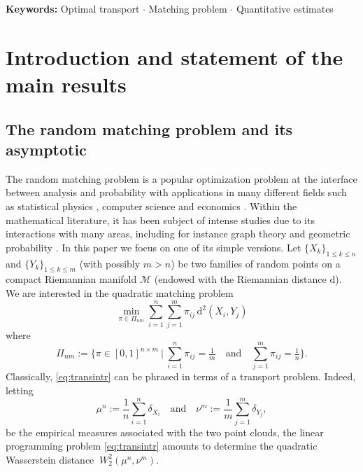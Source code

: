 \documentclass[11pt,a4paper,oneside]{amsart}
\numberwithin{equation}{section}
\newcommand{\dd}{\mathrm{d}}
\newcommand{\nc}[1]{\textcolor{red}{[N: #1]}}
\begin{document}
%
\maketitle
%
\begin{center}
\textbf{Keywords: }Optimal transport $\cdot$ Matching problem $\cdot$ Quantitative estimates
\end{center}
%

%
\tableofcontents
%
\section{Introduction and statement of the main results}\label{introsec}
%
\subsection{The random matching problem and its asymptotic}\label{TMP}
%




The random matching problem is a popular optimization problem at the interface between analysis and probability with applications in many different fields such as statistical physics \cite{caracciolo2014scaling, MezPar}, computer science \cite{CSMatch} and economics \cite{EcMatch, GalShap}. Within the mathematical literature, it has been subject of intense studies due to its interactions with many areas, including for instance graph theory \cite{lovasz2009matching} and geometric probability \cite{steele1997probability}. In this paper we focus on one of its simple versions. Let $\{X_k\}_{1\leq k\leq n}$ and $\{Y_k\}_{1\leq k\leq m}$ (with possibly $m>n$) be two families of random points on a compact Riemannian manifold $\mathcal{M}$ (endowed with the Riemannian distance $\dd$). We are interested in the quadratic matching problem
\begin{equation}\label{eq:transintr}
\min_{\pi\in\Pi_{nm}} \sum_{i=1}^n \sum_{j=1}^m \pi_{ij}\,\mathrm{d}^2(X_i ,Y_j)%
\end{equation}
where
$$\Pi_{nm}:=\bigg\{\pi\in [0,1]^{n\times m}\ \Big\vert\ \sum_{i=1}^n \pi_{ij} = \tfrac{1}{m}\quad\text{and}\quad\sum_{j=1}^{m} \pi_{ij} = \tfrac{1}{n}\bigg\}.$$
Classically, \eqref{eq:transintr} can be phrased in terms of a transport problem. Indeed, letting 
\begin{equation}\label{eq:empmeas}
%
\mu^n:=\frac1n\sum_{i=1}^n \delta_{X_i}\quad\text{and}\quad\nu^m:=\frac1m \sum_{j=1}^m \delta_{Y_j},
%
\end{equation}
be the empirical measures associated with the two point clouds, the linear programming problem \eqref{eq:transintr} amounts to determine the quadratic Wasserstein distance $\ W_2^2(\mu^n,\nu^m)$. 
\end{document}
